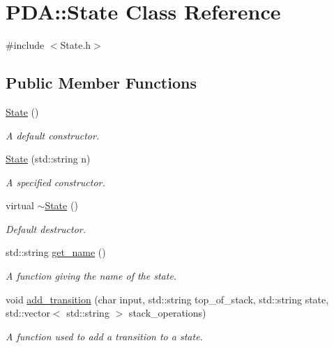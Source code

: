 \hypertarget{classPDA_1_1State}{\section{\-P\-D\-A\-:\-:\-State \-Class \-Reference}
\label{d7/d1f/classPDA_1_1State}
}


{\ttfamily \#include $<$\-State.\-h$>$}

\subsection*{\-Public \-Member \-Functions}
\begin{DoxyCompactItemize}
\item 
\hyperlink{classPDA_1_1State_a2d91cf0f7a8de4153abf523f70f72c89}{\-State} ()
\begin{DoxyCompactList}\small\item\em \-A default constructor. \end{DoxyCompactList}\item 
\hyperlink{classPDA_1_1State_a70be0ec0f495a76b2dd7858885d784a3}{\-State} (std\-::string n)
\begin{DoxyCompactList}\small\item\em \-A specified constructor. \end{DoxyCompactList}\item 
virtual \hyperlink{classPDA_1_1State_a2c301a0f1ba94a1780f016fd6fab17d0}{$\sim$\-State} ()
\begin{DoxyCompactList}\small\item\em \-Default destructor. \end{DoxyCompactList}\item 
std\-::string \hyperlink{classPDA_1_1State_a703a7b3cb61ffc9bd19c4f161c5bb852}{get\-\_\-name} ()
\begin{DoxyCompactList}\small\item\em \-A function giving the name of the state. \end{DoxyCompactList}\item 
void \hyperlink{classPDA_1_1State_a3d89cda9ad229bebb25ef256e3470ec8}{add\-\_\-transition} (char input, std\-::string top\-\_\-of\-\_\-stack, std\-::string state, std\-::vector$<$ std\-::string $>$ stack\-\_\-operations)
\begin{DoxyCompactList}\small\item\em \-A function used to add a transition to a state. \end{DoxyCompactList}\item 

\end{DoxyCompactItemize}
